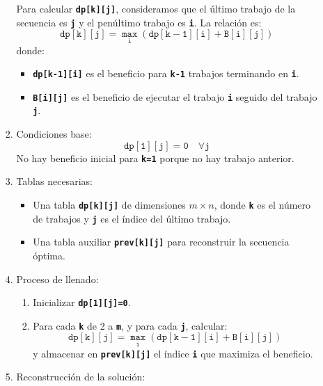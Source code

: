 \begin{enumerate}[label=\color{red}\textbf{\arabic*)}]
\begin{enumerate}[label=\color{red}\alph*)]
\begin{enumerate}[label=\arabic*)]
                      Para calcular \textbf{\texttt{dp[k][j]}}, consideramos que el último trabajo de la secuencia es \textbf{\texttt{j}} y el penúltimo trabajo es \textbf{\texttt{i}}. La relación es: \[
                        \mathbf{\mathtt{dp[k][j]=\underset{i}{\max}(dp[k-1][i]+B[i][j])}}
                      \] donde:
                      \begin{itemize}[label=\textbullet]
                        \item \textbf{\texttt{dp[k-1][i]}} es el beneficio para \textbf{\texttt{k-1}} trabajos terminando en \textbf{\texttt{i}}.
                        \item \textbf{\texttt{B[i][j]}} es el beneficio de ejecutar el trabajo \textbf{\texttt{i}} seguido del trabajo \textbf{\texttt{j}}.
                      \end{itemize}
                    \item Condiciones base: \[
                        \mathbf{\mathtt{dp[1][j]=0\quad \forall j}}
                    \] 
                    No hay beneficio inicial para \textbf{\texttt{k=1}} porque no hay trabajo anterior.
                  \item Tablas necesarias:
                    \begin{itemize}[label=\textbullet]
                      \item Una tabla \textbf{\texttt{dp[k][j]}} de dimensiones $m\times n$, donde \textbf{\texttt{k}} es el número de trabajos y \textbf{\texttt{j}} es el índice del último trabajo.
                      \item Una tabla auxiliar \textbf{\texttt{prev[k][j]}} para reconstruir la secuencia óptima.
                    \end{itemize}
                  \item Proceso de llenado:
                    \begin{enumerate}[label=\arabic*)]
                      \item Inicializar \textbf{\texttt{dp[1][j]=0}}.
                      \item Para cada \textbf{\texttt{k}} de 2 a \textbf{\texttt{m}}, y para cada \textbf{\texttt{j}}, calcular: \[
                          \mathbf{\mathtt{dp[k][j]=\underset{i}{\max}(dp[k-1][i]+B[i][j])}}
                        \] y almacenar en \textbf{\texttt{prev[k][j]}} el índice \textbf{\texttt{i}} que maximiza el beneficio.
                    \end{enumerate}
                  \item Reconstrucción de la solución:


\end{enumerate}
\end{enumerate}
\end{enumerate}
